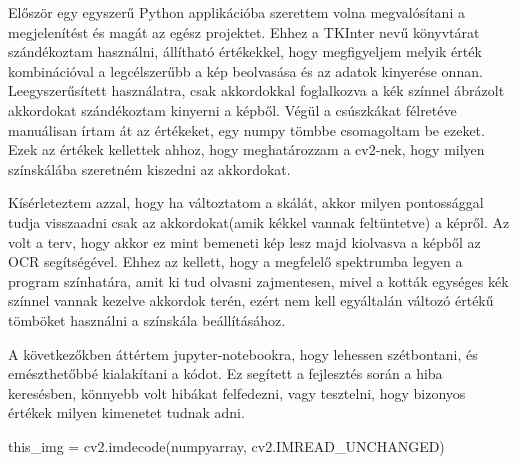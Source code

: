 
Először egy egyszerű Python applikációba szerettem volna megvalósítani a megjelenítést és magát az egész projektet. Ehhez a TKInter nevű könyvtárat szándékoztam használni, állítható értékekkel, hogy megfigyeljem melyik érték kombinációval a legcélszerűbb a kép beolvasása és az adatok kinyerése onnan. Leegyszerűsített használatra, csak akkordokkal foglalkozva a kék színnel ábrázolt akkordokat szándékoztam kinyerni a képből. Végül a csúszkákat félretéve manuálisan írtam át az értékeket, egy numpy tömbbe csomagoltam be ezeket. Ezek az értékek kellettek ahhoz, hogy meghatározzam a cv2-nek, hogy milyen színskálába szeretném kiszedni az akkordokat. 
\par
Kísérleteztem azzal, hogy ha változtatom a skálát, akkor milyen pontossággal tudja visszaadni csak az akkordokat(amik kékkel vannak feltüntetve) a képről. Az volt a terv, hogy akkor ez mint bemeneti kép lesz majd kiolvasva a képből az OCR segítségével. Ehhez az kellett, hogy a megfelelő spektrumba legyen a program színhatára, amit ki tud olvasni zajmentesen, mivel a kották egységes kék színnel vannak kezelve akkordok terén, ezért nem kell egyáltalán változó értékű tömböket használni a színskála beállításához.
\par

A következőkben áttértem jupyter-notebookra, hogy lehessen szétbontani, és emészthetőbbé kialakítani a kódot. Ez segített a fejlesztés során a hiba keresésben, könnyebb volt hibákat felfedezni, vagy tesztelni, hogy bizonyos értékek milyen kimenetet tudnak adni.

\begin{python}
this_img = cv2.imdecode(numpyarray, cv2.IMREAD_UNCHANGED)	
\end{python}

